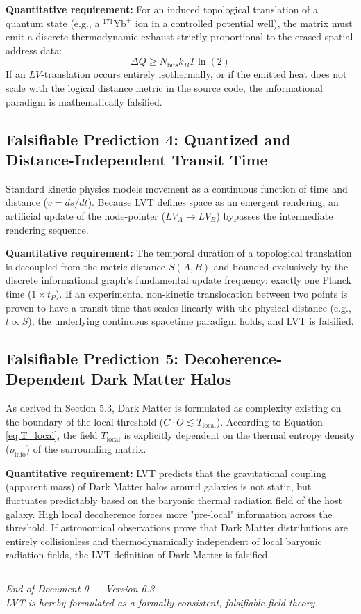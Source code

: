 \documentclass[12pt,a4paper]{article}
\begin{document}
\textbf{Quantitative requirement:} For an induced topological translation of a quantum state (e.g., a $^{171}\text{Yb}^+$ ion in a controlled potential well), the matrix must emit a discrete thermodynamic exhaust strictly proportional to the erased spatial address data: 
$$ \Delta Q \geq N_{\mathrm{bits}} k_B T \ln(2) $$
If an $LV$-translation occurs entirely isothermally, or if the emitted heat does not scale with the logical distance metric in the source code, the informational paradigm is mathematically falsified.

\subsection{Falsifiable Prediction 4: Quantized and Distance-Independent Transit Time}
Standard kinetic physics models movement as a continuous function of time and distance ($v = ds/dt$). Because LVT defines space as an emergent rendering, an artificial update of the node-pointer ($LV_A \to LV_B$) bypasses the intermediate rendering sequence.

\textbf{Quantitative requirement:} The temporal duration of a topological translation is decoupled from the metric distance $S(A,B)$ and bounded exclusively by the discrete informational graph's fundamental update frequency: exactly one Planck time ($1 \times t_P$). If an experimental non-kinetic translocation between two points is proven to have a transit time that scales linearly with the physical distance (e.g., $t \propto S$), the underlying continuous spacetime paradigm holds, and LVT is falsified.

\subsection{Falsifiable Prediction 5: Decoherence-Dependent Dark Matter Halos}
As derived in Section 5.3, Dark Matter is formulated as complexity existing on the boundary of the local threshold ($C \cdot O \lesssim T_{\mathrm{local}}$). According to Equation \ref{eq:T_local}, the field $T_{\mathrm{local}}$ is explicitly dependent on the thermal entropy density ($\rho_{\mathrm{info}}$) of the surrounding matrix.

\textbf{Quantitative requirement:} LVT predicts that the gravitational coupling (apparent mass) of Dark Matter halos around galaxies is not static, but fluctuates predictably based on the baryonic thermal radiation field of the host galaxy. High local decoherence forces more "pre-local" information across the threshold. If astronomical observations prove that Dark Matter distributions are entirely collisionless and thermodynamically independent of local baryonic radiation fields, the LVT definition of Dark Matter is falsified.



\vspace{2em}
\hrule
\vspace{0.5em}
\begin{center}
\small\textit{End of Document 0 --- Version 6.3. \\
LVT is hereby formulated as a formally consistent, falsifiable field theory.}
\end{center}
\end{document}
